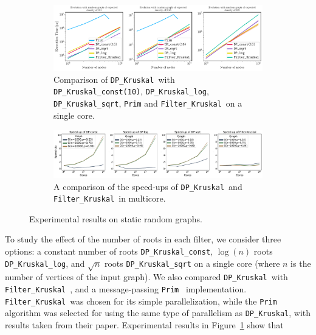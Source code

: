 \documentclass[runningheads,UKenglish]{llncs}
\newcommand{\DPmst}{\texttt{DP\_{Kruskal}}}
\newcommand{\DPmstv}[1]{\texttt{DP\_{Kruskal\_{#1}}}}
\newcommand{\FKruskal}{\texttt{Filter\_{Kruskal}}}
\begin{document}
\begin{figure}%
\begin{center}
    \begin{subfigure}{\textwidth}
    \centering
    \includegraphics[width=\textwidth]{figs/SomeDensities_mixed.pdf}
    \caption{\label{fig:dpmst-versions}Comparison of \DPmst\ with \DPmstv{const(10)}, \DPmstv{log}, \DPmstv{sqrt}, {\tt Prim} and \FKruskal\ on a single core.}
    \end{subfigure}
    
    \begin{subfigure}{\textwidth}
    \centering
    \includegraphics[width=\textwidth]{figs/SpeedUpDPandFK_sample.pdf}
    \caption{\label{fig:speedup_dp_fk}A comparison of the speed-ups of \DPmst\ and \FKruskal\ in multicore.}
    \end{subfigure}
    \caption{Experimental results on static random graphs.}
\end{center}

\end{figure}
%
\vspace{-2em}
\noindent
To study the effect of the number of roots in each filter, we consider three
options: a constant number of roots \DPmstv{const},  $\log(n)$ roots \DPmstv{log}, and $\sqrt{n}$ roots
\DPmstv{sqrt} on a single core (where $n$ is the number of vertices of the input graph).  We also compared \DPmst\ with \FKruskal~\cite{Osipov2009},
and a message-passing {\tt Prim}~\cite{Loncar2014} implementation. \FKruskal\ was chosen for its simple
parallelization, while the {\tt Prim} algorithm was selected for using the same type of parallelism as \DPmst, 
with results taken from their paper. Experimental results in Figure~\ref{fig:dpmst-versions} show that 
\end{document}
